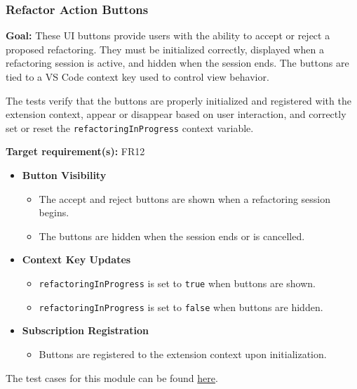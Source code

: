 \documentclass[12pt, titlepage]{article}
\begin{document}
\subsubsection{Refactor Action Buttons}

\textbf{Goal:} These UI buttons provide users with the ability to accept or reject a proposed refactoring. They must be initialized correctly, displayed when a refactoring session is active, and hidden when the session ends. The buttons are tied to a VS Code context key used to control view behavior.

\medskip

\noindent The tests verify that the buttons are properly initialized and registered with the extension context, appear or disappear based on user interaction, and correctly set or reset the \texttt{refactoringInProgress} context variable.

\medskip

\noindent\textbf{Target requirement(s):} FR12~\cite{SRS}

\begin{itemize}
  \item \textbf{Button Visibility}
    \begin{itemize}
      \item The accept and reject buttons are shown when a refactoring session begins.
      \item The buttons are hidden when the session ends or is cancelled.
    \end{itemize}

  \item \textbf{Context Key Updates}
    \begin{itemize}
      \item \texttt{refactoringInProgress} is set to \texttt{true} when buttons are shown.
      \item \texttt{refactoringInProgress} is set to \texttt{false} when buttons are hidden.
    \end{itemize}

  \item \textbf{Subscription Registration}
    \begin{itemize}
      \item Buttons are registered to the extension context upon initialization.
    \end{itemize}
\end{itemize}

\noindent The test cases for this module can be found
\href{https://github.com/ssm-lab/capstone--sco-vs-code-plugin/blob/plugin-multi-file/test/utils/refactorActionButtons.test.ts}{here}.
\end{document}

